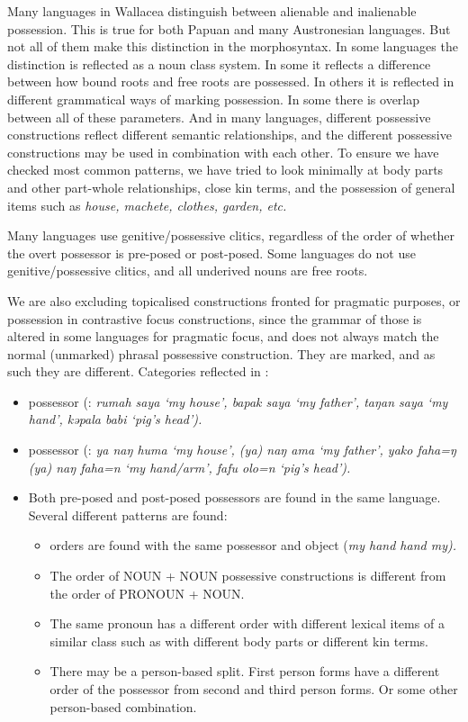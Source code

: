 Many languages in Wallacea distinguish between alienable and inalienable possession.
This is true for both Papuan
and many Austronesian languages.
But not all of them make this distinction in the morphosyntax.
In some languages the distinction is reflected as a noun class system.
In some it reflects a difference between how bound roots
and free roots are possessed.
In others it is reflected in different grammatical ways of marking possession.
In some there is overlap between all of these parameters.
And in many languages,
different possessive constructions reflect different semantic
relationships, and the different possessive constructions may be used in combination with each other.
To ensure we have checked most common patterns,
we have tried to look minimally at body parts
and other part-whole relationships,
close kin terms, and the possession of general items such as
\it{house, machete, clothes, garden}, etc.

Many languages use genitive/possessive clitics,
regardless of the order of whether the overt possessor is pre-posed or post-posed.
Some languages do not use genitive/possessive clitics,
and all underived nouns are free roots.

We are also excluding topicalised constructions fronted for pragmatic
purposes, or possession in contrastive focus constructions,
since the grammar of those is altered in some languages for pragmatic
focus, and does not always match the normal (unmarked) phrasal possessive construction.
They are marked, and as such they are different.
Categories reflected in :

\begin{itemize}
	\item {} possessor (: \it{rumah saya} ‘my
				house’, \it{bapak saya} ‘my father’\it{,
				taŋan saya} ‘my hand’,
				\it{kəpala babi} ‘pig’s head’).
	\item {} possessor (: \it{ya naŋ huma} ‘my
				house’, \it{(ya) naŋ ama} ‘my father’,
				\it{yako faha=ŋ {\tl} (ya) naŋ faha=n} ‘my hand/arm’,
				\it{fafu olo=n} ‘pig’s head’).
	\item Both pre-posed
				and post-posed possessors are found in the same language.
				Several different patterns are found:
	\begin{itemize}
		\item	{} orders are found with the same possessor
					and object (\it{my hand {\tl} hand my}).
		\item	The order of NOUN + NOUN possessive constructions is different
					from the order of PRONOUN + NOUN.
		\item	The same pronoun has a different order with different lexical
					items of a similar class such as with different
					body parts or different kin terms.
		\item	There may be a person-based split.
					First person forms have a different order of the possessor from
					second and third person forms.
					Or some other person-based combination.
	\end{itemize}
\end{itemize}

